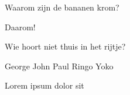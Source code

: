\documentclass{hogent-exam}
\begin{document}
\maketitle

\Supports{}




\begin{questions}

\framedsolutions
\ifsolution
  \printanswers
\else
  \noprintanswers
  \newpage
\fi


\question[10] Waarom zijn de bananen krom?

\begin{solutionordottedlines}[2cm]
  Daarom!
\end{solutionordottedlines}

\question[1] Wie hoort niet thuis in het rijtje?

\begin{oneparcheckboxes}
  \choice George
  \choice John
  \choice Paul
  \choice Ringo
  \CorrectChoice Yoko
\end{oneparcheckboxes}

\question[1] Lorem ipsum dolor sit \fillin[amet][5cm]

\end{questions}

\ScratchNotes
\end{document}
